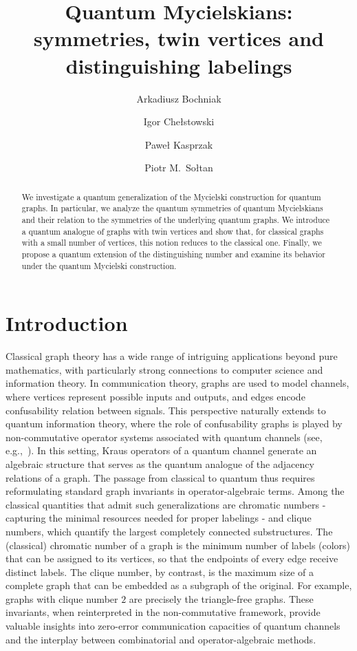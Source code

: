 \documentclass[11pt,reqno]{amsart}
\title{Quantum Mycielskians: symmetries, twin vertices and distinguishing labelings}
\author{Arkadiusz Bochniak}
\author{Igor Che{\l}stowski}
\author{Pawe{\l} Kasprzak}
\author{Piotr M.~So{\l}tan}
\begin{document}
    \maketitle

\begin{abstract}
We investigate a quantum generalization of the Mycielski construction for quantum graphs. In particular, we analyze the quantum symmetries of quantum Mycielskians and their relation to the symmetries of the underlying quantum graphs. We introduce a quantum analogue of graphs with twin vertices and show that, for classical graphs with a small number of vertices, this notion reduces to the classical one. Finally, we propose a quantum extension of the distinguishing number and examine its behavior under the quantum Mycielski construction.
\end{abstract}

\section{Introduction}\label{sec:intr}

Classical graph theory has a wide range of intriguing applications beyond pure mathematics, with particularly strong connections to computer science and information theory. In communication theory, graphs are used to model channels, where vertices represent possible inputs and outputs, and edges encode confusability relation between signals. This perspective naturally extends to quantum information theory, where the role of confusability graphs is played by non-commutative operator systems associated with quantum channels (see, e.g.,~\cite{Brannan_2019, BEV, DuanSeveriniWinter2013, Ganesan, paupaandme}). In this setting, Kraus operators of a quantum channel generate an algebraic structure that serves as the quantum analogue of the adjacency relations of a graph. The passage from classical to quantum thus requires reformulating standard graph invariants in operator-algebraic terms. Among the classical quantities that admit such generalizations are chromatic numbers - capturing the minimal resources needed for proper labelings - and clique numbers, which quantify the largest completely connected substructures. The (classical) chromatic number of a graph is the minimum number of labels (colors) that can be assigned to its vertices, so that the endpoints of every edge receive distinct labels. The clique number, by contrast, is the maximum size of a complete graph that can be embedded as a subgraph of the original. For example, graphs with clique number $2$ are precisely the triangle-free graphs. These invariants, when reinterpreted in the non-commutative framework, provide valuable insights into zero-error communication capacities of quantum channels and the interplay between combinatorial and operator-algebraic methods.
\end{document}
